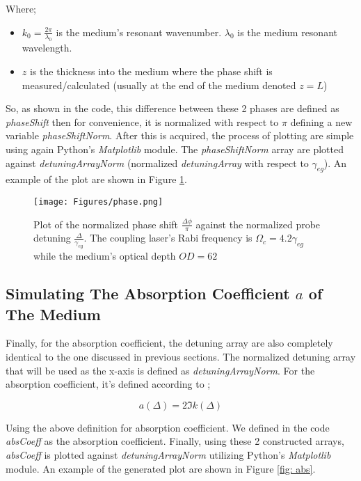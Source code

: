 Where;

\begin{itemize}
    \item $k_{0} = \frac{2\pi}{\lambda_{0}}$ is the medium's resonant wavenumber. $\lambda_{0}$ is the medium resonant wavelength.
    \item $z$ is the thickness into the medium where the phase shift is measured/calculated (usually at the end of the medium denoted $z = L$)
\end{itemize}

So, as shown in the code, this difference between these 2 phases are defined as \textit{phaseShift} then for convenience, it is normalized with respect to $\pi$ defining a new variable \textit{phaseShiftNorm}. After this is acquired, the process of plotting are simple using again Python's \textit{Matplotlib} module. The \textit{phaseShiftNorm} array are plotted against \textit{detuningArrayNorm} (normalized \textit{detuningArray} with respect to $\gamma_{eg}$). An example of the plot are shown in Figure \ref{fig: phase}.

\begin{figure}
    \centering
    \texttt{[image: Figures/phase.png]}
    \caption{Plot of the normalized phase shift $\frac{\Delta\phi}{\pi}$ against the normalized probe detuning $\frac{\Delta}{\gamma_{eg}}$. The coupling laser's Rabi frequency is $\Omega_{c} = 4.2\gamma_{eg}$ while the medium's optical depth $OD = 62$}
    \label{fig: phase}
\end{figure}

\subsection{Simulating The Absorption Coefficient $a$ of The Medium}
Finally, for the absorption coefficient, the detuning array are also completely identical to the one discussed in previous sections. The normalized detuning array that will be used as the x-axis is defined as \textit{detuningArrayNorm}. For the absorption coefficient, it's defined according to \cite{boyd2020nonlinear};

\begin{equation}
    a(\Delta) = 2 \Im{k(\Delta)}
\end{equation}

Using the above definition for absorption coefficient. We defined in the code \textit{absCoeff} as the absorption coefficient. Finally, using these 2 constructed arrays, \textit{absCoeff} is plotted against \textit{detuningArrayNorm} utilizing Python's \textit{Matplotlib} module. An example of the generated plot are shown in Figure \ref{fig: abs}.

